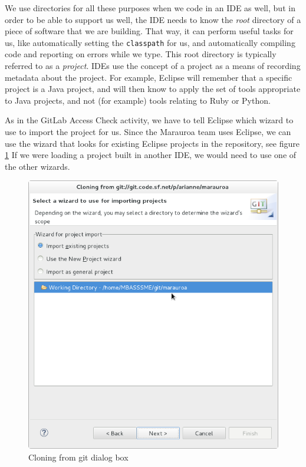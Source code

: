 \documentclass[
]{book}
\begin{document}
We use directories for all these purposes when we code in an IDE as well, but in order to be able to support us well, the IDE needs to know the \emph{root} directory of a piece of software that we are building. That way, it can perform useful tasks for us, like automatically setting the \texttt{classpath} for us, and automatically compiling code and reporting on errors while we type. This root directory is typically referred to as a \emph{project}. IDEs use the concept of a project as a means of recording metadata about the project. For example, Eclipse will remember that a specific project is a Java project, and will then know to apply the set of tools appropriate to Java projects, and not (for example) tools relating to Ruby or Python.

As in the GitLab Access Check activity, we have to tell Eclipse which wizard to use to import the project for us. Since the Marauroa team uses Eclipse, we can use the wizard that looks for existing Eclipse projects in the repository, see figure \ref{fig:wizardImport-fig} If we were loading a project built in another IDE, we would need to use one of the other wizards.

\begin{figure}

{\centering \includegraphics[width=1\linewidth]{images/1.4wizardImport} 

}

\caption{Cloning from git dialog box}\label{fig:wizardImport-fig}
\end{figure}
\end{document}
